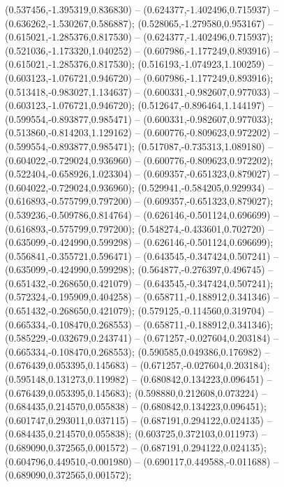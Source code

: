  (0.537456,-1.395319,0.836830) -- (0.624377,-1.402496,0.715937) -- (0.636262,-1.530267,0.586887);
 (0.528065,-1.279580,0.953167) -- (0.615021,-1.285376,0.817530) -- (0.624377,-1.402496,0.715937);
 (0.521036,-1.173320,1.040252) -- (0.607986,-1.177249,0.893916) -- (0.615021,-1.285376,0.817530);
 (0.516193,-1.074923,1.100259) -- (0.603123,-1.076721,0.946720) -- (0.607986,-1.177249,0.893916);
 (0.513418,-0.983027,1.134637) -- (0.600331,-0.982607,0.977033) -- (0.603123,-1.076721,0.946720);
 (0.512647,-0.896464,1.144197) -- (0.599554,-0.893877,0.985471) -- (0.600331,-0.982607,0.977033);
 (0.513860,-0.814203,1.129162) -- (0.600776,-0.809623,0.972202) -- (0.599554,-0.893877,0.985471);
 (0.517087,-0.735313,1.089180) -- (0.604022,-0.729024,0.936960) -- (0.600776,-0.809623,0.972202);
 (0.522404,-0.658926,1.023304) -- (0.609357,-0.651323,0.879027) -- (0.604022,-0.729024,0.936960);
 (0.529941,-0.584205,0.929934) -- (0.616893,-0.575799,0.797200) -- (0.609357,-0.651323,0.879027);
 (0.539236,-0.509786,0.814764) -- (0.626146,-0.501124,0.696699) -- (0.616893,-0.575799,0.797200);
 (0.548274,-0.433601,0.702720) -- (0.635099,-0.424990,0.599298) -- (0.626146,-0.501124,0.696699);
 (0.556841,-0.355721,0.596471) -- (0.643545,-0.347424,0.507241) -- (0.635099,-0.424990,0.599298);
 (0.564877,-0.276397,0.496745) -- (0.651432,-0.268650,0.421079) -- (0.643545,-0.347424,0.507241);
 (0.572324,-0.195909,0.404258) -- (0.658711,-0.188912,0.341346) -- (0.651432,-0.268650,0.421079);
 (0.579125,-0.114560,0.319704) -- (0.665334,-0.108470,0.268553) -- (0.658711,-0.188912,0.341346);
 (0.585229,-0.032679,0.243741) -- (0.671257,-0.027604,0.203184) -- (0.665334,-0.108470,0.268553);
 (0.590585,0.049386,0.176982) -- (0.676439,0.053395,0.145683) -- (0.671257,-0.027604,0.203184);
 (0.595148,0.131273,0.119982) -- (0.680842,0.134223,0.096451) -- (0.676439,0.053395,0.145683);
 (0.598880,0.212608,0.073224) -- (0.684435,0.214570,0.055838) -- (0.680842,0.134223,0.096451);
 (0.601747,0.293011,0.037115) -- (0.687191,0.294122,0.024135) -- (0.684435,0.214570,0.055838);
 (0.603725,0.372103,0.011973) -- (0.689090,0.372565,0.001572) -- (0.687191,0.294122,0.024135);
 (0.604796,0.449510,-0.001980) -- (0.690117,0.449588,-0.011688) -- (0.689090,0.372565,0.001572);
